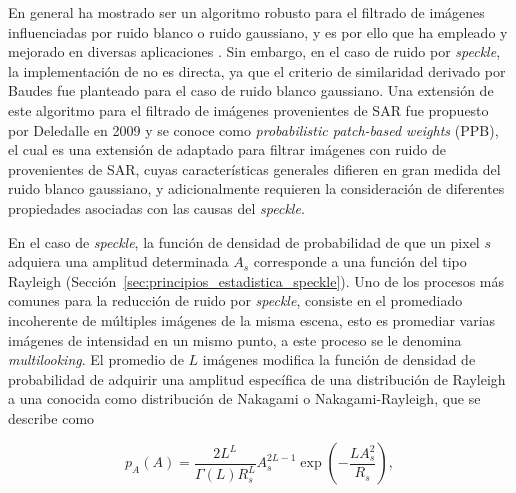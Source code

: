 En general \nlmeans ha mostrado ser un algoritmo robusto para el filtrado de imágenes influenciadas por ruido blanco o ruido gaussiano, y es por ello que ha empleado y mejorado en diversas aplicaciones \cite{Mairal2009,Mahmoudi2005,Kervrann2007,Liu2008,Coupe2008}. Sin embargo, en el caso de ruido por \textit{speckle}, la implementación de \nlmeans no es directa, ya que el criterio de similaridad derivado por Baudes \etal \cite{Baudes2005} fue planteado para el caso de ruido blanco gaussiano. Una extensión de este algoritmo para el filtrado de imágenes provenientes de SAR fue propuesto por Deledalle \etal en 2009 \cite{Deledalle2009} y se conoce como \textit{probabilistic patch-based weights} (PPB), el cual es una extensión de \nlmeans adaptado para filtrar imágenes con ruido de \speckle provenientes de SAR, cuyas características generales difieren en gran medida del ruido blanco gaussiano, y adicionalmente requieren la consideración de diferentes propiedades asociadas con las causas del \textit{speckle}. 


En el caso de \textit{speckle}, la función de densidad de probabilidad de que un pixel $s$ adquiera una amplitud determinada $A_s$ corresponde a una función del tipo Rayleigh (Sección~\ref{sec:principios_estadistica_speckle}). Uno de los procesos más comunes para la reducción de ruido por \textit{speckle}, consiste en el promediado incoherente de múltiples imágenes de la misma escena, esto es promediar varias imágenes de intensidad en un mismo punto, a este proceso se le denomina \textit{multilooking}. El promedio de $L$ imágenes modifica la función de densidad de probabilidad de adquirir una amplitud específica de una distribución de Rayleigh a una conocida como distribución de Nakagami o Nakagami-Rayleigh, que se describe como \cite{Deledalle2009}

\begin{equation}
\label{eq:p_A_nakagami}
p_A(A) = \frac{2L^L}{\Gamma(L)R_s^L} A^{2L-1}_s \exp\left(-\frac{LA_s^2}{R_s}\right),
\end{equation}

